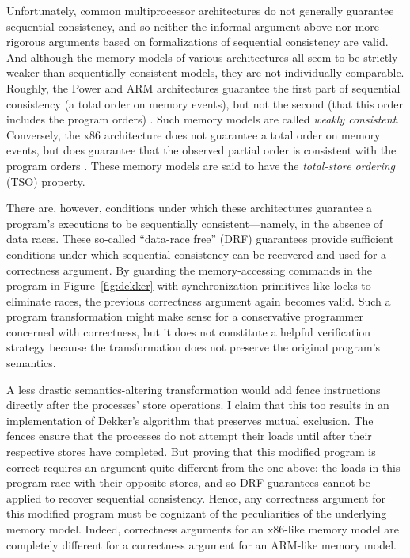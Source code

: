 \documentclass[11pt]{report}
\begin{document}
Unfortunately, common multiprocessor architectures do not generally guarantee sequential consistency, and so neither the informal argument above nor more rigorous arguments based on formalizations of sequential consistency are valid. And although the memory models of various architectures all seem to be strictly weaker than sequentially consistent models, they are not individually comparable. Roughly, the Power and ARM architectures guarantee the first part of sequential consistency (a total order on memory events), but not the second (that this order includes the program orders) \cite{DBLP:conf/popl/2009damp,DBLP:conf/asplos/ChongI08}. Such memory models are called \emph{weakly consistent}. Conversely, the x86 architecture does not guarantee a total order on memory events, but does guarantee that the observed partial order is consistent with the program orders \cite{DBLP:conf/tphol/OwensSS09}. These memory models are said to have the \emph{total-store ordering} (TSO) property.

There are, however, conditions under which these architectures guarantee a program's executions to be sequentially consistent---namely, in the absence of data races. These so-called ``data-race free'' (DRF) guarantees provide sufficient conditions under which sequential consistency can be recovered and used for a correctness argument. By guarding the memory-accessing commands in the program in Figure~\ref{fig:dekker} with synchronization primitives like locks to eliminate races, the previous correctness argument again becomes valid. Such a program transformation might make sense for a conservative programmer concerned with correctness, but it does not constitute a helpful verification strategy because the transformation does not preserve the original program's semantics.


A less drastic semantics-altering transformation would add fence instructions directly after the processes' store operations. I claim that this too results in an implementation of Dekker's algorithm that preserves mutual exclusion. The fences ensure that the processes do not attempt their loads until after their respective stores have completed. But proving that this modified program is correct requires an argument quite different from the one above: the loads in this program race with their opposite stores, and so DRF guarantees cannot be applied to recover sequential consistency. Hence, any correctness argument for this modified program must be cognizant of the peculiarities of the underlying memory model. Indeed, correctness arguments for an x86-like memory model are completely different for a correctness argument for an ARM-like memory model.
\end{document}
